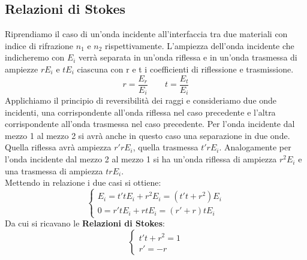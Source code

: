 \documentclass{article}
\begin{document}
\subsection{Relazioni di Stokes}
Riprendiamo il caso di un'onda incidente all'interfaccia tra due materiali con indice di rifrazione $n_1$ e $n_2$ rispettivamente. L'ampiezza dell'onda incidente che indicheremo con $E_i$ verrà separata in un'onda riflessa e in un'onda trasmessa di ampiezze $rE_i$ e $tE_i$ ciascuna con r e t i coefficienti di riflessione e trasmissione.
\begin{equation*}
r = \frac{E_r}{E_i} \qquad t = \frac{E_t}{E_i}
\end{equation*}
Applichiamo il principio di reversibilità dei raggi e consideriamo due onde incidenti, una corrispondente all'onda riflessa nel caso precedente e l'altra corrispondente all'onda trasmessa nel caso precedente. Per l'onda incidente dal mezzo 1 al mezzo 2 si avrà anche in questo caso una separazione in due onde. Quella riflessa avrà ampiezza $r'rE_i$, quella trasmessa $t'rE_i$. Analogamente per l'onda incidente dal mezzo 2 al mezzo 1 si ha un'onda riflessa di ampiezza $r^2E_i$ e una trasmessa di ampiezza $trE_i$.\\
Mettendo in relazione i due casi si ottiene:
\begin{equation*}
\begin{cases}
E_i = t'tE_i + r^2E_i = (t't + r^2)E_i \\
0 = r'tE_i + rtE_i = (r' + r)tE_i
\end{cases}
\end{equation*}
Da cui si ricavano le \textbf{Relazioni di Stokes}:
\begin{equation}
\begin{cases}
t' t + r^2 = 1\\
r' = -r
\end{cases}
\end{equation}
\end{document}
